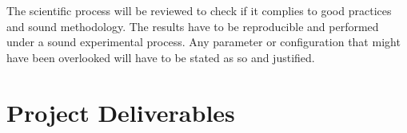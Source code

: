The scientific process will be reviewed to check if it complies to good practices and sound methodology. The results have to be reproducible and performed under a sound experimental process. Any parameter or configuration that might have been overlooked will have to be stated as so and justified.


\section{Project Deliverables}
